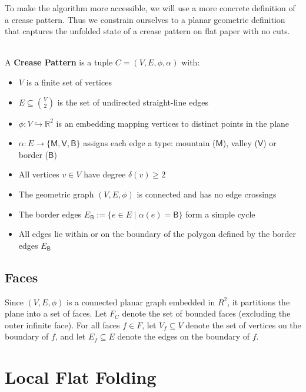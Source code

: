 To make the algorithm more accessible, we will use a more concrete definition of a crease pattern.
Thus we constrain ourselves to a planar geometric definition that captures the unfolded state of a crease pattern on flat paper with no cuts.

\begin{definition}
~\\
A \textbf{Crease Pattern} is a tuple $C = (V, E, \phi, \alpha)$ with:
\begin{itemize}
    \item $V$ is a finite set of vertices
    \item $E \subseteq \binom{V}{2}$ is the set of undirected straight-line edges
    \item $\phi: V \hookrightarrow \mathbb{R}^2$ is an embedding mapping vertices to distinct points in the plane
    \item $\alpha: E \to \{\mathsf{M}, \mathsf{V}, \mathsf{B}\}$ assigns each edge a type: mountain ($\mathsf{M}$), valley ($\mathsf{V}$) or border ($\mathsf{B}$)
    \item All vertices $v \in V$ have degree $\delta(v) \geq 2$
    \item The geometric graph $(V, E, \phi)$ is connected and has no edge crossings
    \item The border edges $E_{\mathsf{B}} := \{e \in E \mid \alpha(e) = \mathsf{B}\}$ form a simple cycle
    \item All edges lie within or on the boundary of the polygon defined by the border edges $E_{\mathsf{B}}$
\end{itemize}
\end{definition}


\subsection{Faces}
Since $(V,E,\phi)$ is a connected planar graph embedded in $R^2$, it partitions the plane into a set of faces.
Let $F_C$ denote the set of bounded faces (excluding the outer infinite face).
For all faces $f \in F$, let $V_f \subseteq V$ denote the set of vertices on the boundary of $f$, and let $E_f \subseteq E$ denote the edges on the boundary of $f$.

\section{Local Flat Folding}

